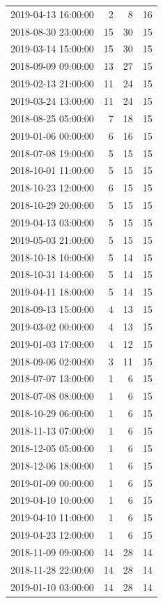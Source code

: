 \begin{tabular}{lrrr}
2019-04-13 16:00:00 & 2 & 8 & 16 \\
2018-08-30 23:00:00 & 15 & 30 & 15 \\
2019-03-14 15:00:00 & 15 & 30 & 15 \\
2018-09-09 09:00:00 & 13 & 27 & 15 \\
2019-02-13 21:00:00 & 11 & 24 & 15 \\
2019-03-24 13:00:00 & 11 & 24 & 15 \\
2018-08-25 05:00:00 & 7 & 18 & 15 \\
2019-01-06 00:00:00 & 6 & 16 & 15 \\
2018-07-08 19:00:00 & 5 & 15 & 15 \\
2018-10-01 11:00:00 & 5 & 15 & 15 \\
2018-10-23 12:00:00 & 6 & 15 & 15 \\
2018-10-29 20:00:00 & 5 & 15 & 15 \\
2019-04-13 03:00:00 & 5 & 15 & 15 \\
2019-05-03 21:00:00 & 5 & 15 & 15 \\
2018-10-18 10:00:00 & 5 & 14 & 15 \\
2018-10-31 14:00:00 & 5 & 14 & 15 \\
2019-04-11 18:00:00 & 5 & 14 & 15 \\
2018-09-13 15:00:00 & 4 & 13 & 15 \\
2019-03-02 00:00:00 & 4 & 13 & 15 \\
2019-01-03 17:00:00 & 4 & 12 & 15 \\
2018-09-06 02:00:00 & 3 & 11 & 15 \\
2018-07-07 13:00:00 & 1 & 6 & 15 \\
2018-07-08 08:00:00 & 1 & 6 & 15 \\
2018-10-29 06:00:00 & 1 & 6 & 15 \\
2018-11-13 07:00:00 & 1 & 6 & 15 \\
2018-12-05 05:00:00 & 1 & 6 & 15 \\
2018-12-06 18:00:00 & 1 & 6 & 15 \\
2019-01-09 00:00:00 & 1 & 6 & 15 \\
2019-04-10 10:00:00 & 1 & 6 & 15 \\
2019-04-10 11:00:00 & 1 & 6 & 15 \\
2019-04-23 12:00:00 & 1 & 6 & 15 \\
2018-11-09 09:00:00 & 14 & 28 & 14 \\
2018-11-28 22:00:00 & 14 & 28 & 14 \\
2019-01-10 03:00:00 & 14 & 28 & 14 \\

\end{tabular}
